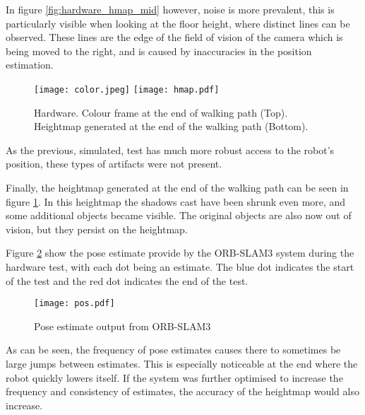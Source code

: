         \noindent
        In figure \ref{fig:hardware_hmap_mid} however, noise is more prevalent, this is particularly visible when looking at the floor height, where distinct lines can be observed. These lines are the edge of the field of vision of the camera which is being moved to the right, and is caused by inaccuracies in the position estimation.
        \begin{figure}[h]
            \centering
            \hspace{-0.8cm}
            \texttt{[image: color.jpeg]}
            \texttt{[image: hmap.pdf]}
            \caption{Hardware. Colour frame at the end of walking path (Top). Heightmap generated at the end of the walking path (Bottom).}
            \label{fig:hardware_hmap}
        \end{figure}
        As the previous, simulated, test has much more robust access to the robot's position, these types of artifacts were not present.

        Finally, the heightmap generated at the end of the walking path can be seen in figure \ref{fig:hardware_hmap}. In this heightmap the shadows cast have been shrunk even more, and some additional objects became visible. The original objects are also now out of vision, but they persist on the heightmap. 

        Figure \ref{fig:hardware_pos}  show the pose estimate provide by the ORB-SLAM3 system during the hardware test, with each dot being an estimate. The blue dot indicates the start of the test and the red dot indicates the end of the test.
        \begin{figure}[h]
            \centering
            \texttt{[image: pos.pdf]}
            \caption{Pose estimate output from ORB-SLAM3}
            \label{fig:hardware_pos}
        \end{figure}

        \noindent
        As can be seen, the frequency of pose estimates causes there to sometimes be large jumps between estimates. This is especially noticeable at the end where the robot quickly lowers itself. If the system was further optimised to increase the frequency and consistency of estimates, the accuracy of the heightmap would also increase.

